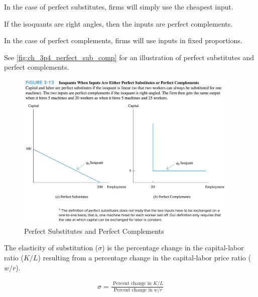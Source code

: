 In the case of perfect substitutes, 
firms will simply use the cheapest input.

\begin{definition}
    
    If the isoquants are right angles, 
    then the inputs are perfect complements.
    
\end{definition}

In the case of perfect complements,
firms will use inputs in fixed proportions.

See \autoref{fig:ch_3p4_perfect_sub_comp}
for an illustration of perfect substitutes
and perfect complements.

\FloatBarrier

\begin{figure}[!htb]
    \centering
        \includegraphics[width=0.95\textwidth]{../input/ch_3p4_perfect_sub_comp.png}
    \caption{Perfect Substitutes and Perfect Complements}
    \label{fig:ch_3p4_perfect_sub_comp}
\end{figure}

\FloatBarrier



\begin{definition}

    The elasticity of substitution ($\sigma$)
    is the percentage change in the
    capital-labor ratio ($K/L$)
    resulting from a percentage change in the
    capital-labor price ratio ($w/r$).
    
    \begin{align}
        \sigma=\frac{\text { Percent change in } K / L}{\text { Percent change in } w / r}
    \end{align}
    
\end{definition}


